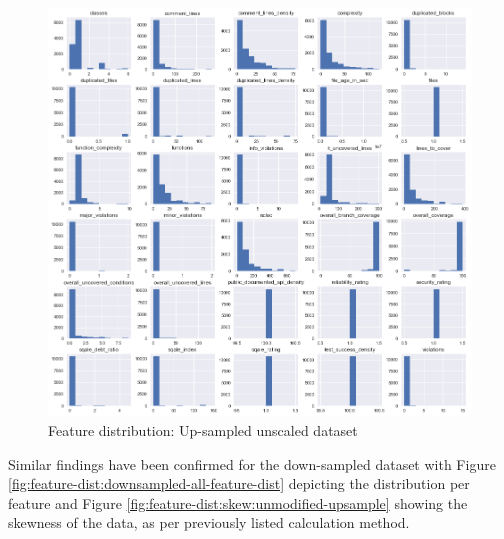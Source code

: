 \begin{figure}[!h]
    \centering
    \includegraphics[scale=0.45]{Figures/feature-dist/attrib_dist_upscaled_unmod.png}
    \caption{Feature distribution: Up-sampled unscaled dataset}
    \label{fig:feature-dist:upsampled-all-feature-dist}
\end{figure}

Similar findings have been confirmed for the down-sampled dataset with Figure \ref{fig:feature-dist:downsampled-all-feature-dist} depicting the distribution per feature and Figure \ref{fig:feature-dist:skew:unmodified-upsample} showing the skewness of the data, as per previously listed calculation method.

